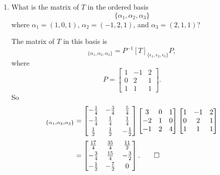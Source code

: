 \begin{enumerate}
\item What is the matrix of $T$ in the ordered basis
  \begin{equation*}
    \{\alpha_1,\alpha_2,\alpha_3\}
  \end{equation*}
  where $\alpha_1 = (1,0,1)$, $\alpha_2 = (-1,2,1)$, and
  $\alpha_3 = (2,1,1)$?
  \begin{solution}
    The matrix of $T$ in this basis is
    \begin{equation*}
      [T]_{\{\alpha_1,\alpha_2,\alpha_3\}}
      = P^{-1}[T]_{\{\epsilon_1,\epsilon_2,\epsilon_3\}}P,
    \end{equation*}
    where
    \begin{equation*}
      P =
      \begin{bmatrix}
        1 & -1 & 2 \\
        0 & 2 & 1 \\
        1 & 1 & 1
      \end{bmatrix}.
    \end{equation*}
    So
    \begin{align*}
      [T]_{\{\alpha_1,\alpha_2,\alpha_3\}}
      &=
      \begin{bmatrix}
        -\frac14 & -\frac34 & \frac54 \\[3pt]
        -\frac14 & \frac14 & \frac14 \\[3pt]
        \frac12 & \frac12 & -\frac12
      \end{bmatrix}
      \begin{bmatrix}
        3 & 0 & 1 \\
        -2 & 1 & 0 \\
        -1 & 2 & 4
      \end{bmatrix}
      \begin{bmatrix}
        1 & -1 & 2 \\
        0 & 2 & 1 \\
        1 & 1 & 1
      \end{bmatrix} \\[3pt]
      &=
      \begin{bmatrix}
        \frac{17}4 & \frac{35}4 & \frac{11}2 \\[3pt]
        -\frac34 & \frac{15}4 & -\frac32 \\[3pt]
        -\frac12 & -\frac72 & 0
      \end{bmatrix}. \qedhere
    \end{align*}
  \end{solution}


\end{enumerate}
